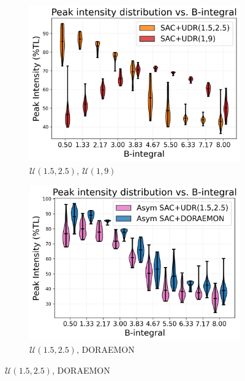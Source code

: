\begin{figure}
    \centering
    \begin{subfigure}[b]{0.33\textwidth}
        \centering
        \includegraphics[width=\linewidth]{images/many_udrs_violin.png}
        \caption{\( \mathcal{U}(1.5, 2.5), \ \mathcal{U}(1, 9) \)}
        \label{fig:picking_right_udr_hard}
    \end{subfigure}
    \hfill
    \begin{subfigure}[b]{0.33\textwidth}
        \centering
        \includegraphics[width=\linewidth]{images/udr_vs_doraemon_violin.png}
        \caption{\( \mathcal{U}(1.5, 2.5) \), DORAEMON} 
        \label{fig:doraemon_outperforms_udr_violin}
    \end{subfigure}

\end{figure}
